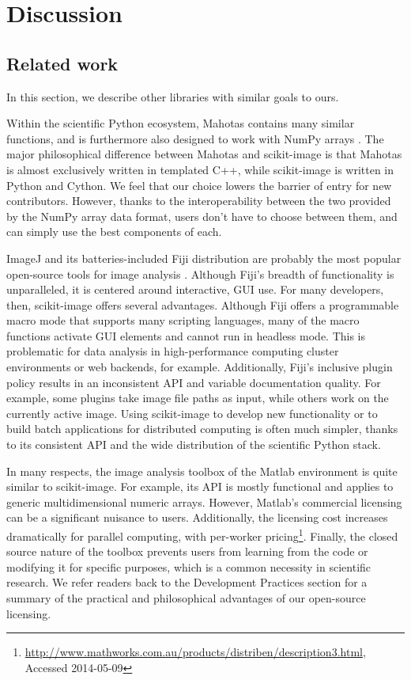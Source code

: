 
\section*{Discussion}
  \label{sec:discussion}

  \subsection*{Related work}

  In this section, we describe other libraries with similar goals to ours.
  
  Within the scientific Python ecosystem, Mahotas contains many similar
  functions, and is furthermore also designed to work with NumPy arrays
  \citep{Mahotas}. The major philosophical difference between Mahotas and
  scikit-image is that Mahotas is almost exclusively written in templated C++,
  while scikit-image is written in Python and Cython. We feel that our choice
  lowers the barrier of entry for new contributors. However,
  thanks to the interoperability between the two provided by the NumPy array
  data format, users don't have to choose between them, and can simply use the
  best components of each.

  ImageJ and its batteries-included Fiji distribution are probably the most
  popular open-source tools for image analysis \citep{imagej,Fiji}. Although 
  Fiji's breadth of functionality is unparalleled, it is centered around 
  interactive, GUI use. For many developers, then, scikit-image offers several
  advantages. Although Fiji offers a
  programmable macro mode that supports many scripting languages, many of the
  macro functions activate GUI elements and cannot run in headless mode. This
  is problematic for data analysis in high-performance computing
  cluster environments or web backends, for example. Additionally, Fiji's
  inclusive plugin policy results in an inconsistent API and variable
  documentation quality. For example,
  some plugins take image file paths as input, while others work on the
  currently active image. Using scikit-image to develop new functionality or
  to build batch applications for distributed computing is often much simpler,
  thanks to its consistent API and the wide distribution of the scientific
  Python stack.

  In many respects, the image analysis toolbox of the Matlab environment is
  quite similar to scikit-image. For example, its API is mostly functional and
  applies to generic multidimensional numeric arrays. However, Matlab's
  commercial licensing can be a significant nuisance to users. Additionally,
  the licensing cost increases dramatically for parallel computing, with
  per-worker pricing\footnote{\url{http://www.mathworks.com.au/products/distriben/description3.html}, Accessed 2014-05-09}.
  Finally, the closed source nature of the toolbox prevents users from
  learning from the code or modifying it for specific purposes, which is a
  common necessity in scientific research. We refer readers back to the
  Development Practices section for a summary of the practical and
  philosophical advantages of our open-source licensing.

